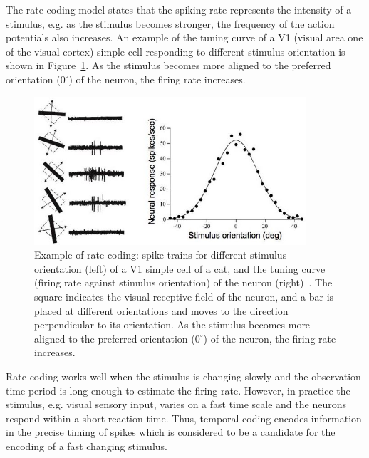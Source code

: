 The rate coding model states that the spiking rate represents the intensity of a stimulus, e.g. as the stimulus becomes stronger, the frequency of the action potentials also increases.
An example of the tuning curve of a V1 (visual area one of the visual cortex) simple cell responding to different stimulus orientation is shown in Figure~\ref{Fig:v1}.
As the stimulus becomes more aligned to the preferred orientation ($0^\circ$) of the neuron, the firing rate increases.

\begin{figure}[bt]
	\centering
	\includegraphics[width=0.9\textwidth]{pics_snn/v1.jpg}
	\caption[Example of rate coding~\citep{hubel1962receptive}.]{Example of rate coding: spike trains for different stimulus orientation (left) of a V1 simple cell of a cat, and the tuning curve (firing rate against stimulus orientation) of the neuron (right)~\citep{hubel1962receptive}.
	The square indicates the visual receptive field of the neuron, and a bar is placed at different orientations and moves to the direction perpendicular to its orientation.
    As the stimulus becomes more aligned to the preferred orientation ($0^\circ$) of the neuron, the firing rate increases.}
	\label{Fig:v1}
\end{figure}

Rate coding works well when the stimulus is changing slowly and the observation time period is long enough to estimate the firing rate.
However, in practice the stimulus, e.g. visual sensory input, varies on a fast time scale and the neurons respond within a short reaction time.
Thus, temporal coding encodes information in the precise timing of spikes which is considered to be a candidate for the encoding of a fast changing stimulus.

